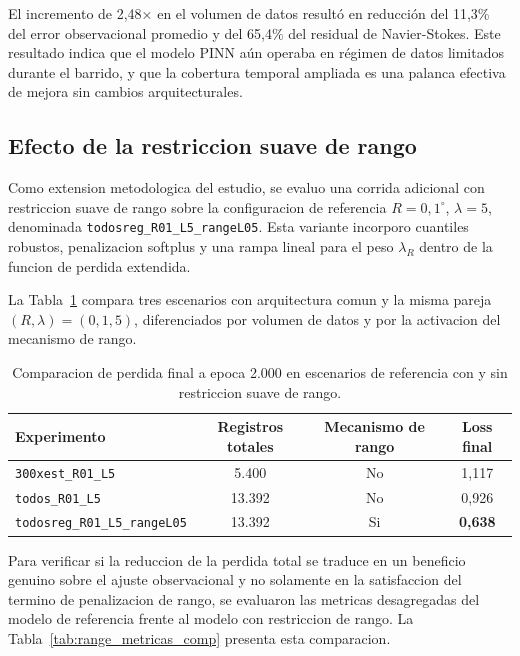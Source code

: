 El incremento de 2,48× en el volumen de datos resultó en reducción del 11,3\% del error observacional promedio y del 65,4\% del residual de Navier-Stokes. Este resultado indica que el modelo PINN aún operaba en régimen de datos limitados durante el barrido, y que la cobertura temporal ampliada es una palanca efectiva de mejora sin cambios arquitecturales.

\subsection{Efecto de la restriccion suave de rango}

Como extension metodologica del estudio, se evaluo una corrida adicional con restriccion suave de rango sobre la configuracion de referencia $R=0{,}1^\circ$, $\lambda=5$, denominada \texttt{todosreg\_R01\_L5\_rangeL05}. Esta variante incorporo cuantiles robustos, penalizacion softplus y una rampa lineal para el peso $\lambda_R$ dentro de la funcion de perdida extendida.

La Tabla~\ref{tab:range_loss_comp} compara tres escenarios con arquitectura comun y la misma pareja $(R,\lambda)=(0{,}1,5)$, diferenciados por volumen de datos y por la activacion del mecanismo de rango.

\begin{table}[H]
\centering
\begin{tabular}{lccc}
\hline
Experimento & Registros totales & Mecanismo de rango & Loss final \\
\hline
\texttt{300xest\_R01\_L5} & 5.400 & No & 1,117 \\
\texttt{todos\_R01\_L5} & 13.392 & No & 0,926 \\
\texttt{todosreg\_R01\_L5\_rangeL05} & 13.392 & Si & \textbf{0,638} \\
\hline
\end{tabular}
\caption{Comparacion de perdida final a epoca 2.000 en escenarios de referencia con y sin restriccion suave de rango.}
\label{tab:range_loss_comp}
\end{table}

Para verificar si la reduccion de la perdida total se traduce en un beneficio genuino sobre el ajuste observacional y no solamente en la satisfaccion del termino de penalizacion de rango, se evaluaron las metricas desagregadas del modelo de referencia frente al modelo con restriccion de rango. La Tabla~\ref{tab:range_metricas_comp} presenta esta comparacion.

